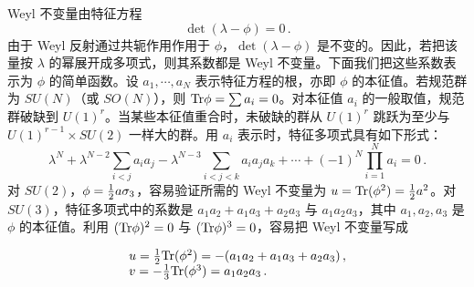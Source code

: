 Weyl 不变量由特征方程
$$
\det (\lambda - \phi ) = 0\,.
$$
由于 Weyl 反射通过共轭作用作用于 $\phi$，$\det (\lambda-\phi)$ 是不变的。因此，若把该量按 $\lambda$ 的幂展开成多项式，则其系数都是 Weyl 不变量。下面我们把这些系数表示为 $\phi$ 的简单函数。设 $a_1,\cdots , a_N$ 表示特征方程的根，亦即 $\phi$ 的本征值。若规范群为 $SU(N)$（或 $SO(N)$），则 ${\rm Tr}\phi=\sum a_i=0$。对本征值 $a_i$ 的一般取值，规范群破缺到 $U(1)^r$。当某些本征值重合时，未破缺的群从 $U(1)^r$ 跳跃为至少与 $U(1)^{r-1}\times SU(2)$ 一样大的群。用 $a_i$ 表示时，特征多项式具有如下形式：
$$
\lambda^N + \lambda^{N-2} \sum_{i<j} a_ia_j - \lambda^{N-3}
\sum_{i<j<k} a_ia_ja_k + \cdots + (-1)^N \prod_{i=1}^N a_i = 0\,.
$$
对 $SU(2)$，$\phi={1\over 2}a\sigma_3$，容易验证所需的 Weyl 不变量为 $u={\rm Tr}(\phi^2)={1\over2}a^2$。对 $SU(3)$，特征多项式中的系数是 $a_1a_2+a_1a_3+a_2a_3$ 与 $a_1 a_2 a_3$，其中 $a_1, a_2, a_3$ 是 $\phi$ 的本征值。利用 $({\rm Tr}\phi)^2=0$ 与 $({\rm Tr}\phi)^3=0$，容易把 Weyl 不变量写成


$$
\begin{array}{ll}
u=\frac{1}{2}{\rm Tr}(\phi^2)=-(a_1a_2+a_1a_3+a_2a_3)\,,  \\
v=-\frac{1}{3}{\rm Tr}(\phi^3)=a_1 a_2 a_3\,.
\end{array}
$$

